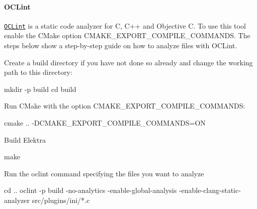 \paragraph*{O\+C\+Lint}

\href{http://oclint.org/}{\tt O\+C\+Lint} is a static code analyzer for C, C++ and Objective C. To use this tool enable the C\+Make option {\ttfamily C\+M\+A\+K\+E\+\_\+\+E\+X\+P\+O\+R\+T\+\_\+\+C\+O\+M\+P\+I\+L\+E\+\_\+\+C\+O\+M\+M\+A\+N\+DS}. The steps below show a step-\/by-\/step guide on how to analyze files with O\+C\+Lint.


\begin{DoxyEnumerate}
\item Create a build directory if you have not done so already and change the working path to this directory\+:
\end{DoxyEnumerate}


\begin{DoxyCode}
mkdir -p build
cd build
\end{DoxyCode}



\begin{DoxyEnumerate}
\item Run C\+Make with the option {\ttfamily C\+M\+A\+K\+E\+\_\+\+E\+X\+P\+O\+R\+T\+\_\+\+C\+O\+M\+P\+I\+L\+E\+\_\+\+C\+O\+M\+M\+A\+N\+DS}\+:
\end{DoxyEnumerate}


\begin{DoxyCode}
cmake .. -DCMAKE\_EXPORT\_COMPILE\_COMMANDS=ON
\end{DoxyCode}



\begin{DoxyEnumerate}
\item Build Elektra
\end{DoxyEnumerate}


\begin{DoxyCode}
make
\end{DoxyCode}



\begin{DoxyEnumerate}
\item Run the {\ttfamily oclint} command specifying the files you want to analyze
\end{DoxyEnumerate}


\begin{DoxyCode}
cd ..
oclint -p build -no-analytics -enable-global-analysis -enable-clang-static-analyzer src/plugins/ini/*.c
\end{DoxyCode}


